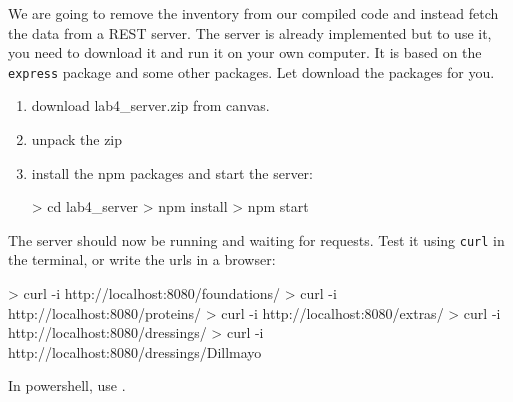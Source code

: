 \documentclass[fleqn, article, a4paper]{memoir}
\begin{document}
\begin{Assignments}

\item We are going to remove the inventory from our compiled code and instead fetch the data from a REST server. The server is already implemented but to use it, you need to download it and run it on your own computer. It is based on the \texttt{express} package and some other packages. Let  download the packages for you.
\begin{enumerate}
  \item download lab4\_server.zip from canvas.
  \item unpack the zip
  \item install the npm packages and start the server:
\begin{Code}
> cd lab4_server
> npm install
> npm start
\end{Code}
\end{enumerate}
The server should now be running and waiting for requests. Test it using \texttt{curl} in the terminal, or write the urls in a browser:
\begin{Code}
> curl -i http://localhost:8080/foundations/
> curl -i http://localhost:8080/proteins/
> curl -i http://localhost:8080/extras/
> curl -i http://localhost:8080/dressings/
> curl -i http://localhost:8080/dressings/Dillmayo
\end{Code}

\noindent In powershell, use .



\end{Assignments}
\end{document}
